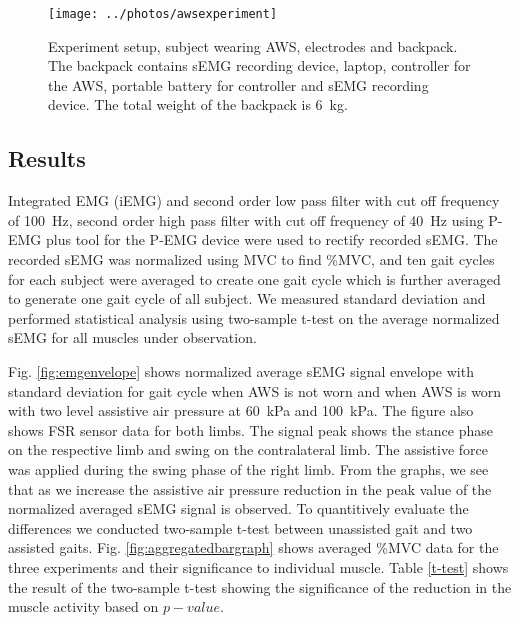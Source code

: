 \documentclass[letterpaper, 10 pt, conference]{ieeeconf}  %
\begin{document}
\begin{figure}
	\centering
	\texttt{[image: ../photos/awsexperiment]}
	\caption{Experiment setup, subject wearing AWS, electrodes and backpack. The backpack contains sEMG recording device, laptop, controller for the AWS, portable battery for controller and sEMG recording device. The total weight of the backpack is \SI{6}{\kilogram}.}
	\label{fig:experimentsetup}
\end{figure}

\subsection{Results}

Integrated EMG (iEMG) and second order low pass filter with cut off frequency of \SI{100}{\hertz}, second order high pass filter with cut off frequency of \SI{40}{\hertz} using P-EMG plus tool for the P-EMG device were used to rectify recorded sEMG. The recorded sEMG was normalized using MVC to find \%MVC, and ten gait cycles for each subject were averaged to create one gait cycle which is further averaged to generate one gait cycle of all subject. We measured standard deviation and performed statistical analysis using two-sample t-test on the average normalized sEMG for all muscles under observation.

Fig. \ref{fig:emgenvelope} shows normalized average sEMG signal envelope with standard deviation for gait cycle when AWS is not worn and when AWS is worn with two level assistive air pressure at \SI{60}{\kilo\pascal} and \SI{100}{\kilo\pascal}. The figure also shows FSR sensor data for both limbs. The signal peak shows the stance phase on the respective limb and swing on the contralateral limb. The assistive force was applied during the swing phase of the right limb. From the graphs, we see that as we increase the assistive air pressure reduction in the peak value of the normalized averaged sEMG signal is observed. To quantitively evaluate the differences we conducted two-sample t-test between unassisted gait and two assisted gaits. Fig. \ref{fig:aggregatedbargraph} shows averaged \%MVC data for the three experiments and their significance to individual muscle. Table \ref{t-test} shows the result of the two-sample t-test showing the significance of the reduction in the muscle activity based on $p-value$. 
\end{document}
